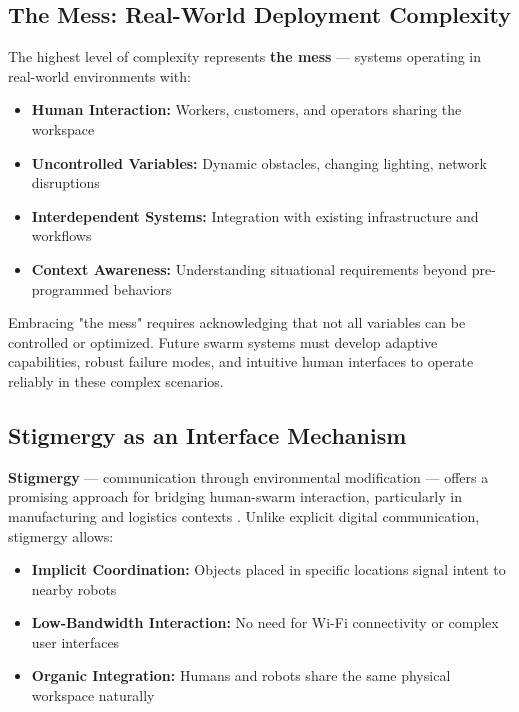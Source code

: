 \subsection{The Mess: Real-World Deployment Complexity}
\label{subsec:mess}

The highest level of complexity represents \textbf{the mess} --- systems operating in real-world environments with:

\begin{itemize}
    \item \textbf{Human Interaction:} Workers, customers, and operators sharing the workspace
    \item \textbf{Uncontrolled Variables:} Dynamic obstacles, changing lighting, network disruptions
    \item \textbf{Interdependent Systems:} Integration with existing infrastructure and workflows
    \item \textbf{Context Awareness:} Understanding situational requirements beyond pre-programmed behaviors
\end{itemize}

Embracing "the mess" requires acknowledging that not all variables can be controlled or optimized. Future swarm systems must develop adaptive capabilities, robust failure modes, and intuitive human interfaces to operate reliably in these complex scenarios.

\subsection{Stigmergy as an Interface Mechanism}
\label{subsec:stigmergy}

\textbf{Stigmergy} --- communication through environmental modification --- offers a promising approach for bridging human-swarm interaction, particularly in manufacturing and logistics contexts \cite{garzonramos2024designing}. Unlike explicit digital communication, stigmergy allows:

\begin{itemize}
    \item \textbf{Implicit Coordination:} Objects placed in specific locations signal intent to nearby robots
    \item \textbf{Low-Bandwidth Interaction:} No need for Wi-Fi connectivity or complex user interfaces
    \item \textbf{Organic Integration:} Humans and robots share the same physical workspace naturally
\end{itemize}

